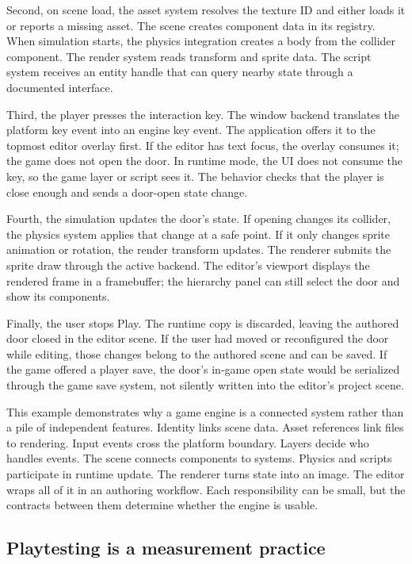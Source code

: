Second, on scene load, the asset system resolves the texture ID and either loads it or reports a missing asset. The scene creates component data in its registry. When simulation starts, the physics integration creates a body from the collider component. The render system reads transform and sprite data. The script system receives an entity handle that can query nearby state through a documented interface.

Third, the player presses the interaction key. The window backend translates the platform key event into an engine key event. The application offers it to the topmost editor overlay first. If the editor has text focus, the overlay consumes it; the game does not open the door. In runtime mode, the UI does not consume the key, so the game layer or script sees it. The behavior checks that the player is close enough and sends a door-open state change.

Fourth, the simulation updates the door's state. If opening changes its collider, the physics system applies that change at a safe point. If it only changes sprite animation or rotation, the render transform updates. The renderer submits the sprite draw through the active backend. The editor's viewport displays the rendered frame in a framebuffer; the hierarchy panel can still select the door and show its components.

Finally, the user stops Play. The runtime copy is discarded, leaving the authored door closed in the editor scene. If the user had moved or reconfigured the door while editing, those changes belong to the authored scene and can be saved. If the game offered a player save, the door's in-game open state would be serialized through the game save system, not silently written into the editor's project scene.

This example demonstrates why a game engine is a connected system rather than a pile of independent features. Identity links scene data. Asset references link files to rendering. Input events cross the platform boundary. Layers decide who handles events. The scene connects components to systems. Physics and scripts participate in runtime update. The renderer turns state into an image. The editor wraps all of it in an authoring workflow. Each responsibility can be small, but the contracts between them determine whether the engine is usable.

\subsection{Playtesting is a measurement practice}\label{06-engine-ii-ch041-playtesting-is-a-measurement-practice}

